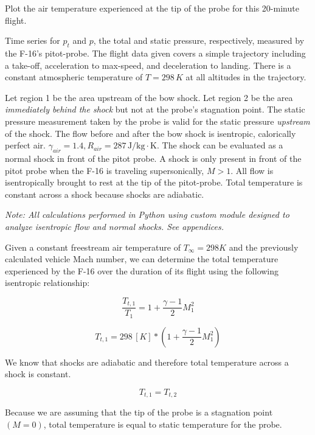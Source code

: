 \documentclass[../main.tex]{subfiles}
\begin{document}
\clearpage

 Plot the air temperature experienced at the tip of the probe for this 20-minute flight.

\givens{}

Time series for \(p_t\) and \(p\), the total and static pressure, respectively, measured by the F-16's pitot-probe.
The flight data given covers a simple trajectory including a take-off, acceleration to max-speed, and deceleration to landing.
There is a constant atmospheric temperature of \(T=298\,K\) at all altitudes in the trajectory.

\assumptions{}

Let region 1 be the area upstream of the bow shock.
Let region 2 be the area \textit{immediately behind the shock} but not at the probe's stagnation point.
The static pressure measurement taken by the probe is valid for the static pressure \textit{upstream} of the shock.
The flow before and after the bow shock is isentropic, calorically perfect air. \(\gamma_{air} = 1.4, R_{air} = 287 \, \unit{\joule/\kilogram\cdot\kelvin}\).
The shock can be evaluated as a normal shock in front of the pitot probe.
A shock is only present in front of the pitot probe when the F-16 is traveling supersonically, \(M > 1\).
All flow is isentropically brought to rest at the tip of the pitot-probe. Total temperature is constant across a shock because shocks are adiabatic.

\solution{}

\textit{Note: All calculations performed in Python using custom module designed to analyze isentropic flow and normal shocks. See appendices.}

Given a constant freestream air temperature of \(T_\infty = 298 K\) and the previously calculated vehicle Mach number, we can determine the total temperature experienced by the F-16 over the duration of its flight using the following isentropic relationship:

\[
    \frac{T_{t,1}}{T_1} = 1 + \frac{\gamma-1}{2} M_1^2
\]

\[
   T_{t,1} = 298 \, [K]* \left({1 + \frac{\gamma-1}{2} M_1^2}\right)
\]

We know that shocks are adiabatic and therefore total temperature across a shock is constant.

\[
    T_{t,1} = T_{t,2}
\]

Because we are assuming that the tip of the probe is a stagnation point \((M=0)\), total temperature is equal to static temperature for the probe.
\end{document}
